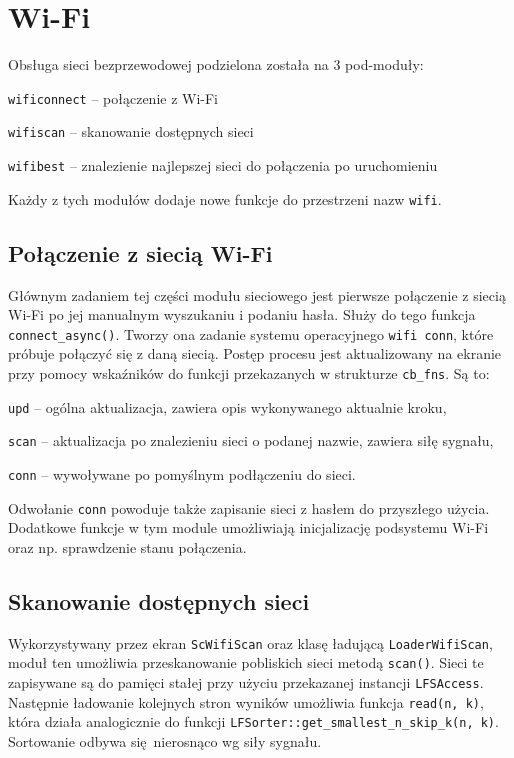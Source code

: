 \documentclass[polish]{aghengthesis}
\let\tempone\itemize
\let\temptwo\enditemize
\renewenvironment{itemize}{\tempone\setlength{\itemsep}{0cm}}{\temptwo}
\begin{document}
	\section{Wi-Fi}
		Obsługa sieci bezprzewodowej podzielona została na 3 pod-moduły:
		\begin{itemize}
			\item \lstinline|wificonnect| -- połączenie z Wi-Fi
			\item \lstinline|wifiscan| -- skanowanie dostępnych sieci
			\item \lstinline|wifibest| -- znalezienie najlepszej sieci do połączenia po uruchomieniu
		\end{itemize}
		
		Każdy z tych modułów dodaje nowe funkcje do przestrzeni nazw \lstinline|wifi|.
		
		\subsection{Połączenie z siecią Wi-Fi}
			Głównym zadaniem tej części modułu sieciowego jest pierwsze połączenie z siecią Wi-Fi po jej manualnym wyszukaniu i podaniu hasła. Służy do tego funkcja \lstinline|connect_async()|. Tworzy ona zadanie systemu operacyjnego \lstinline|wifi conn|, które próbuje połączyć się z daną siecią. Postęp procesu jest aktualizowany na ekranie przy pomocy wskaźników do funkcji przekazanych w strukturze \lstinline|cb_fns|. Są to:
			\begin{itemize}
				\item \lstinline|upd| -- ogólna aktualizacja, zawiera opis wykonywanego aktualnie kroku,
				\item \lstinline|scan| -- aktualizacja po znalezieniu sieci o podanej nazwie, zawiera siłę sygnału,
				\item \lstinline|conn| -- wywoływane po pomyślnym podłączeniu do sieci.
			\end{itemize}
			
			Odwołanie \lstinline|conn| powoduje także zapisanie sieci z hasłem do przyszłego użycia. Dodatkowe funkcje w tym module umożliwiają inicjalizację podsystemu Wi-Fi oraz np. sprawdzenie stanu połączenia.
			
		\subsection{Skanowanie dostępnych sieci}
			Wykorzystywany przez ekran \lstinline|ScWifiScan| oraz klasę ładującą \lstinline|LoaderWifiScan|, moduł ten umożliwia przeskanowanie pobliskich sieci metodą \lstinline|scan()|. Sieci te zapisywane są do pamięci stałej przy użyciu przekazanej instancji \lstinline|LFSAccess|. Następnie ładowanie kolejnych stron wyników umożliwia funkcja \lstinline|read(n, k)|, która działa analogicznie do funkcji \lstinline|LFSorter::get_smallest_n_skip_k(n, k)|. Sortowanie odbywa się nierosnąco wg siły sygnału.
			
\end{document}
